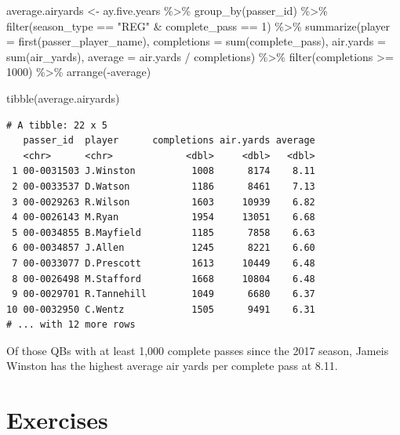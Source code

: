 \documentclass[
  letterpaper,
]{krantz}
\newenvironment{Shaded}{\begin{snugshade}}{\end{snugshade}}
\newcommand{\AttributeTok}[1]{\textcolor[rgb]{0.40,0.45,0.13}{#1}}
\newcommand{\DecValTok}[1]{\textcolor[rgb]{0.68,0.00,0.00}{#1}}
\newcommand{\FunctionTok}[1]{\textcolor[rgb]{0.28,0.35,0.67}{#1}}
\newcommand{\NormalTok}[1]{\textcolor[rgb]{0.00,0.23,0.31}{#1}}
\newcommand{\OtherTok}[1]{\textcolor[rgb]{0.00,0.23,0.31}{#1}}
\newcommand{\SpecialCharTok}[1]{\textcolor[rgb]{0.37,0.37,0.37}{#1}}
\newcommand{\StringTok}[1]{\textcolor[rgb]{0.13,0.47,0.30}{#1}}
\begin{document}
\begin{Shaded}
\begin{Highlighting}[]
\NormalTok{average.airyards }\OtherTok{\textless{}{-}}\NormalTok{ ay.five.years }\SpecialCharTok{\%\textgreater{}\%}
  \FunctionTok{group\_by}\NormalTok{(passer\_id) }\SpecialCharTok{\%\textgreater{}\%}
  \FunctionTok{filter}\NormalTok{(season\_type }\SpecialCharTok{==} \StringTok{"REG"} \SpecialCharTok{\&}\NormalTok{ complete\_pass }\SpecialCharTok{==} \DecValTok{1}\NormalTok{) }\SpecialCharTok{\%\textgreater{}\%}
  \FunctionTok{summarize}\NormalTok{(}\AttributeTok{player =} \FunctionTok{first}\NormalTok{(passer\_player\_name),}
            \AttributeTok{completions =} \FunctionTok{sum}\NormalTok{(complete\_pass),}
            \AttributeTok{air.yards =} \FunctionTok{sum}\NormalTok{(air\_yards),}
            \AttributeTok{average =}\NormalTok{ air.yards }\SpecialCharTok{/}\NormalTok{ completions) }\SpecialCharTok{\%\textgreater{}\%}
  \FunctionTok{filter}\NormalTok{(completions }\SpecialCharTok{\textgreater{}=} \DecValTok{1000}\NormalTok{) }\SpecialCharTok{\%\textgreater{}\%}
  \FunctionTok{arrange}\NormalTok{(}\SpecialCharTok{{-}}\NormalTok{average)}

\FunctionTok{tibble}\NormalTok{(average.airyards)}
\end{Highlighting}
\end{Shaded}

\begin{verbatim}
# A tibble: 22 x 5
   passer_id  player      completions air.yards average
   <chr>      <chr>             <dbl>     <dbl>   <dbl>
 1 00-0031503 J.Winston          1008      8174    8.11
 2 00-0033537 D.Watson           1186      8461    7.13
 3 00-0029263 R.Wilson           1603     10939    6.82
 4 00-0026143 M.Ryan             1954     13051    6.68
 5 00-0034855 B.Mayfield         1185      7858    6.63
 6 00-0034857 J.Allen            1245      8221    6.60
 7 00-0033077 D.Prescott         1613     10449    6.48
 8 00-0026498 M.Stafford         1668     10804    6.48
 9 00-0029701 R.Tannehill        1049      6680    6.37
10 00-0032950 C.Wentz            1505      9491    6.31
# ... with 12 more rows
\end{verbatim}

Of those QBs with at least 1,000 complete passes since the 2017 season,
Jameis Winston has the highest average air yards per complete pass at
8.11.

\hypertarget{exercises}{%
\section{Exercises}\label{exercises}}
\end{document}
